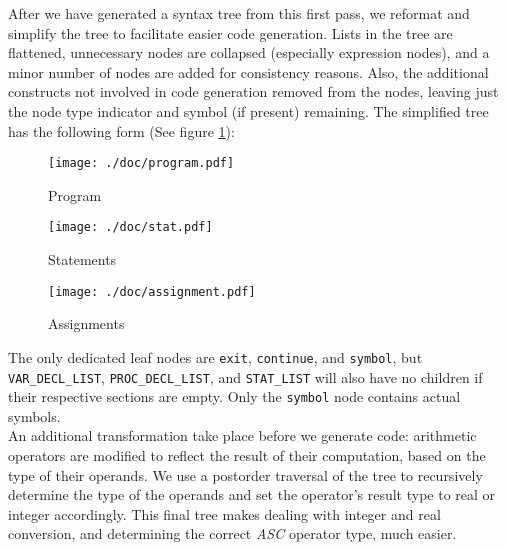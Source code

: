 \documentclass{report}
\begin{document}
After we have generated a syntax tree from this first pass, we reformat and simplify the tree to facilitate easier code generation. Lists in the tree are flattened, unnecessary nodes are collapsed (especially expression nodes), and a minor number of nodes are added for consistency reasons. Also, the additional constructs not involved in code generation removed from the nodes, leaving just the node type indicator and symbol (if present) remaining. The simplified tree has the following form (See figure \ref{fig:program}):\\

\begin{figure}[ht]
\caption{Program}
\centering
\texttt{[image: ./doc/program.pdf]}
\label{fig:program}
\end{figure}

\begin{figure}[ht]
\caption{Statements}
\centering
\texttt{[image: ./doc/stat.pdf]}
\label{fig:stat}
\end{figure}

\begin{figure}[ht]
\caption{Assignments}
\centering
\texttt{[image: ./doc/assignment.pdf]}\\
\label{fig:assign}
\end{figure}

The only dedicated leaf nodes are \texttt{exit}, \texttt{continue}, and \texttt{symbol}, but \texttt{VAR\_DECL\_LIST}, \texttt{PROC\_DECL\_LIST},  and \texttt{STAT\_LIST} will also have no children if their respective sections are empty. Only the \texttt{symbol} node contains actual symbols.\\

An additional transformation take place before we generate code: arithmetic operators are modified to reflect the result of their computation, based on the type of their operands. We use a postorder traversal of the tree to recursively determine the type of the operands and set the operator's result type to real or integer accordingly. This final tree makes dealing with integer and real conversion, and determining the correct \emph{ASC} operator type, much easier.
\end{document}
